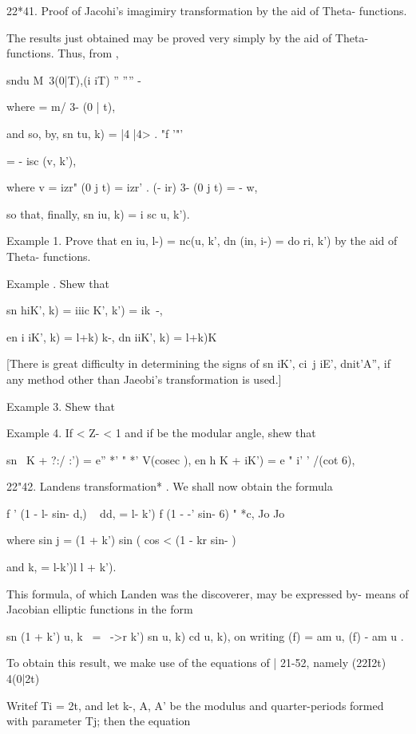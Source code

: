 22*41. Proof of Jacohi's imagimiry transformation by the aid of Theta-
functions.

The results just obtained may be proved very simply by the aid of
Theta-functions. Thus, from ,

sndu M\ 3(0|T),(i iT) '' '''' -%

where = m/ 3- (0 | t),

and so, by, sn tu, k) = |4 |4> . "f '"'

= - isc (v, k'),

where v = izr" (0 j t) = izr' . (- ir) 3- (0 j t) = - w,

so that, finally, sn iu, k) = i sc u, k').

Example 1. Prove that en iu, l-) = nc(u, k', dn (in, i-) = do ri, k')
by the aid of Theta- functions.

Example . Shew that

sn hiK', k) = iiic K', k') = ik~-,

en i iK', k) = l+k) k-, dn iiK', k) = l+k)K

[There is great difficulty in determining the signs of sn iK', ci\ j
iE', dnit'A'', if any method other than Jaeobi's transformation is
used.]

%
%

Example 3. Shew that

Example 4. If < Z- < 1 and if be the modular angle, shew that

sn \ K + ?:/ :') = e'' *' " *' V(cosec ), en h K + iK') = e " i' '
/(cot 6),

 22"42. Landens transformation* . We shall now obtain the
formula

f ' (1 - l- sin- d,) ~ dd, = l- k') f (1 - -' sin- 6) " *c, Jo Jo

where sin j = (1 + k') sin ( cos < (1 - kr sin- ) ~

and k, = l-k')l l + k').

This formula, of which Landen was the discoverer, may be expressed by-
means of Jacobian elliptic functions in the form

sn (1 + k') u, k \ = \ ->r k') sn u, k) cd u, k), on writing (f) = am
u, (f) - am u .

To obtain this result, we make use of the equations of | 21-52, namely
(22I2t) 4(0|2t)

Writef Ti = 2t, and let k-, A, A' be the modulus and quarter-periods
formed with parameter Tj; then the equation

